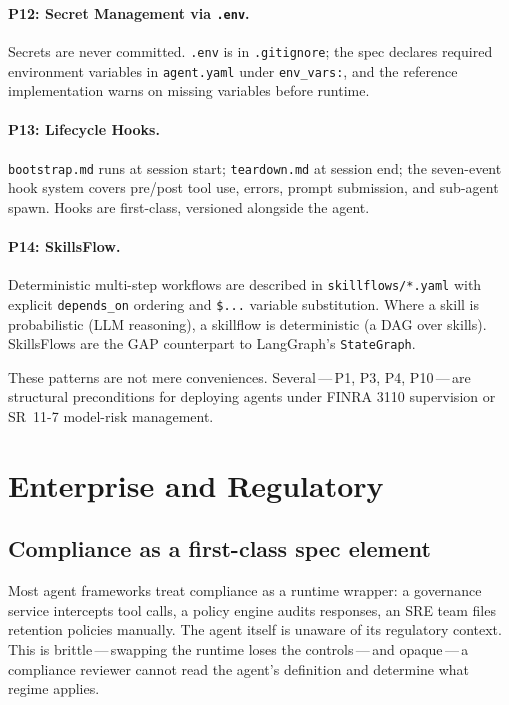\documentclass[11pt,a4paper]{article}
\begin{document}
\paragraph{P12: Secret Management via \texttt{.env}.}
Secrets are never committed. \texttt{.env} is in \texttt{.gitignore}; the spec
declares required environment variables in \texttt{agent.yaml} under
\texttt{env\_vars:}, and the reference implementation warns on missing variables
before runtime.

\paragraph{P13: Lifecycle Hooks.}
\texttt{bootstrap.md} runs at session start; \texttt{teardown.md} at session end; the
seven-event hook system covers pre/post tool use, errors, prompt submission, and
sub-agent spawn. Hooks are first-class, versioned alongside the agent.

\paragraph{P14: SkillsFlow.}
Deterministic multi-step workflows are described in \texttt{skillflows/*.yaml} with
explicit \texttt{depends\_on} ordering and \texttt{\${{...}}} variable substitution.
Where a skill is probabilistic (LLM reasoning), a skillflow is deterministic (a DAG
over skills). SkillsFlows are the GAP counterpart to LangGraph's \texttt{StateGraph}.

\vspace{0.5em}
These patterns are not mere conveniences. Several\,---\,P1, P3, P4, P10\,---\,are
structural preconditions for deploying agents under FINRA 3110 supervision or
SR~11-7 model-risk management.

\section{Enterprise and Regulatory}\label{sec:compliance}

\subsection{Compliance as a first-class spec element}

Most agent frameworks treat compliance as a runtime wrapper: a governance service
intercepts tool calls, a policy engine audits responses, an SRE team files retention
policies manually. The agent itself is unaware of its regulatory context. This is
brittle\,---\,swapping the runtime loses the controls\,---\,and opaque\,---\,a
compliance reviewer cannot read the agent's definition and determine what regime
applies.
\end{document}
